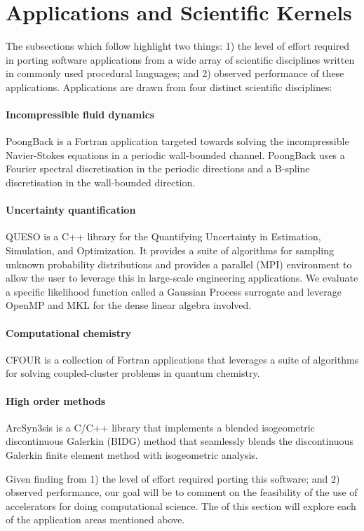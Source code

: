 \section{Applications and Scientific Kernels}
\label{sec:apps}

The subsections which follow highlight two things: 1) the level of effort
required in porting software applications from a wide array of scientific
disciplines written in commonly used procedural languages; and 2) observed
performance of these applications.  Applications are drawn from four distinct
scientific disciplines:

\paragraph{Incompressible fluid dynamics}  PoongBack is a Fortran application
targeted towards solving the incompressible Navier-Stokes equations in a
periodic wall-bounded channel.  PoongBack uses a Fourier spectral
discretisation in the periodic directions and a B-spline discretisation in the
wall-bounded direction.

\paragraph{Uncertainty quantification}  QUESO is a C++ library for the
Quantifying Uncertainty in Estimation, Simulation, and Optimization.  It
provides a suite of algorithms for sampling unknown probability distributions
and provides a parallel (MPI) environment to allow the user to leverage this in
large-scale engineering applications.  We evaluate a specific likelihood
function called a Gaussian Process surrogate and leverage OpenMP and MKL for
the dense linear algebra involved.

\paragraph{Computational chemistry}  CFOUR is a collection of Fortran
applications that leverages a suite of algorithms for solving coupled-cluster
problems in quantum chemistry.

\paragraph{High order methods}  ArcSyn3sis is a C/C++ library that implements
a blended isogeometric discontinuous Galerkin (BIDG) method that seamlessly
blends the discontinuous Galerkin finite element method with isogeometric analysis.

Given finding from 1) the level of effort required porting this software; and
2) observed performance, our goal will be to comment on the feasibility of the
use of accelerators for doing computational science.  The of this section will
explore each of the application areas mentioned above.
